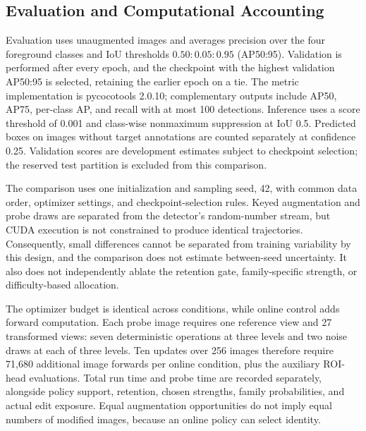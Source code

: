\documentclass[conference]{IEEEtran}
\begin{document}
\subsection{Evaluation and Computational Accounting}
\label{sec:setup_evaluation}
Evaluation uses unaugmented images and averages precision over the four foreground classes and IoU thresholds $0.50{:}0.05{:}0.95$ (AP50:95). Validation is performed after every epoch, and the checkpoint with the highest validation AP50:95 is selected, retaining the earlier epoch on a tie. The metric implementation is pycocotools 2.0.10; complementary outputs include AP50, AP75, per-class AP, and recall with at most 100 detections. Inference uses a score threshold of 0.001 and class-wise nonmaximum suppression at IoU 0.5. Predicted boxes on images without target annotations are counted separately at confidence 0.25. Validation scores are development estimates subject to checkpoint selection; the reserved test partition is excluded from this comparison.

The comparison uses one initialization and sampling seed, 42, with common data order, optimizer settings, and checkpoint-selection rules. Keyed augmentation and probe draws are separated from the detector's random-number stream, but CUDA execution is not constrained to produce identical trajectories. Consequently, small differences cannot be separated from training variability by this design, and the comparison does not estimate between-seed uncertainty. It also does not independently ablate the retention gate, family-specific strength, or difficulty-based allocation.

The optimizer budget is identical across conditions, while online control adds forward computation. Each probe image requires one reference view and 27 transformed views: seven deterministic operations at three levels and two noise draws at each of three levels. Ten updates over 256 images therefore require 71,680 additional image forwards per online condition, plus the auxiliary ROI-head evaluations. Total run time and probe time are recorded separately, alongside policy support, retention, chosen strengths, family probabilities, and actual edit exposure. Equal augmentation opportunities do not imply equal numbers of modified images, because an online policy can select identity.



\end{document}
